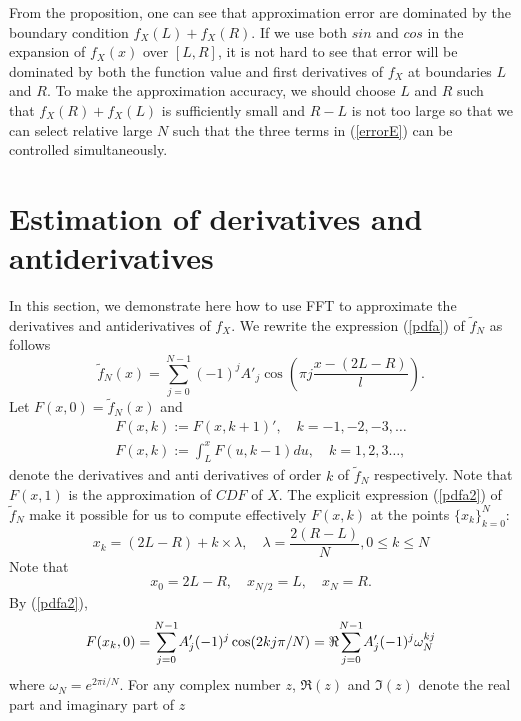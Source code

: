 \documentclass[numreferences]{kluwer}    %
\begin{document}
\begin{article}
From the proposition, one can see that approximation error are
dominated by the boundary condition $f_X(L)+f_X(R)$. If we use both
$sin$ and $cos$ in the expansion of $f_X(x)$ over $[L,R]$, it is not
hard to see that error will be dominated by both the function value
and first derivatives of $f_X$ at boundaries $L$ and $R$.
To make the approximation accuracy, we should choose $L$ and $R$
such that $f_X(R)+f_X(L)$ is sufficiently small and $R-L$ is not too
large so that we can select relative large $N$ such that the three
terms in (\ref{errorE}) can be controlled simultaneously.
\section{Estimation of derivatives and antiderivatives}
In this section, we demonstrate here how to use
FFT to approximate the derivatives and antiderivatives of $f_X$. We
rewrite the expression (\ref{pdfa}) of $\tilde{f}_N$ as follows
\begin{equation}\label{pdfa2}
\tilde{f}_N(x)=\sum_{j=0}^{N-1}(-1)^{j}A'_j \cos(\pi
j\frac{x-(2L-R)}l).
\end{equation}
Let $F(x,0)=\tilde{f}_N(x)$ and
\begin{eqnarray*}
F(x,k):=F(x,k+1)',\quad k=-1,-2,-3,\dots\\
F(x,k):=\int^{x}_{L} F(u,k-1)du, \quad k=1, 2, 3\dots,
\end{eqnarray*}
denote the derivatives and anti derivatives of order $k$ of
$\tilde{f}_N$ respectively. Note that $F(x,1)$ is the approximation
of $CDF$ of $X$. The explicit expression (\ref{pdfa2}) of
$\tilde{f}_N$ make it possible for us to compute effectively
$F(x,k)$ at the points $\{x_k\}_{k=0}^N$:
\begin{equation}\label{xk}
x_k=(2L-R)+k\times \lambda, \quad \lambda=\frac{2(R-L)}N, 0\le k \le N
\end{equation}
Note that
\[
x_0 = 2L-R, \quad x_{N/2}=L, \quad x_{N}=R.
\]
By (\ref{pdfa2}),
\begin{equation}\label{fxk}
F(x_k,0)={\sum_{j=0}^{N-1}} A_j' (-1)^{j}\cos(2kj\pi/N)\\
=\Re {\sum_{j=0}^{N-1}} A_j' (-1)^{j}\omega_N^{kj}
\end{equation}
where $\omega_N=e^{2\pi i/N}$. For any complex number $z$,  $\Re(z)$
and $\Im(z)$ denote the real part and imaginary part of $z$

\end{article}
\end{document}
